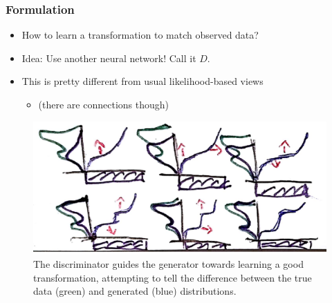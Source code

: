 \documentclass[10pt,mathserif]{beamer}
\begin{document}
\begin{frame}
  \frametitle{Formulation}
 \begin{itemize}
 \item How to learn a transformation to match observed data?
 \item Idea: Use another neural network! Call it $D$.
 \item This is pretty different from usual likelihood-based views
   \begin{itemize}
   \item (there are connections though)
   \end{itemize}
 \end{itemize}
\begin{figure}[ht]
  \centering
  \includegraphics[width=0.7\paperwidth]{figure/discriminator_transformation}
  \caption{The discriminator guides the generator towards learning a good
    transformation, attempting to tell the difference between the true data
    (green) and generated (blue)
    distributions. \label{fig:discriminator_transformation} }
\end{figure}
\end{frame}
\end{document}

